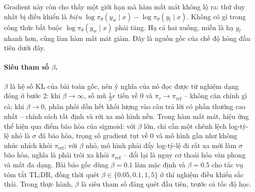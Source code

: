 Gradient này còn cho thấy một giới hạn mà hàm mất mát không lộ ra: thứ duy nhất bị điều khiển là \emph{hiệu} \( \log\pi_{\theta}(y_w \mid x) - \log\pi_{\theta}(y_l \mid x) \). Không có gì trong công thức bắt buộc \( \log\pi_{\theta}(y_w \mid x) \) phải tăng. Hạ cả hai xuống, miễn là hạ \( y_l \) nhanh hơn, cũng làm hàm mất mát giảm. Đây là nguồn gốc của chế độ hỏng đầu tiên dưới đây.

\paragraph{Siêu tham số \( \beta \).}
\( \beta \) là hệ số KL của bài toán gốc, nên ý nghĩa của nó đọc được từ nghiệm dạng đóng ở bước 2: khi \( \beta \to \infty \), số mũ \( \frac{1}{\beta} r \) tiến về 0 và \( \pi_r \to \pi_{\text{ref}} \) -- không căn chỉnh gì cả; khi \( \beta \to 0 \), phân phối dồn hết khối lượng vào câu trả lời có phần thưởng cao nhất -- chính sách tất định và rời xa mô hình nền. Trong hàm mất mát, hiệu ứng thể hiện qua điểm bão hòa của sigmoid: với \( \beta \) lớn, chỉ cần một chênh lệch log-tỷ-lệ nhỏ là \( \sigma \) đã bão hòa, trọng số gradient tụt về 0 và mô hình gần như không nhúc nhích khỏi \( \pi_{\text{ref}} \); với \( \beta \) nhỏ, mô hình phải đẩy log-tỷ-lệ đi rất xa mới làm \( \sigma \) bão hòa, nghĩa là phải trôi xa khỏi \( \pi_{\text{ref}} \) -- đổi lại là nguy cơ thoái hóa văn phong và mất đa dạng. Bài báo gốc dùng \( \beta = 0.1 \) làm mặc định và \( \beta = 0.5 \) cho tác vụ tóm tắt TL;DR, đồng thời quét \( \beta \in \{0.05, 0.1, 1, 5\} \) ở thí nghiệm điều khiển sắc thái. Trong thực hành, \( \beta \) là siêu tham số đáng quét đầu tiên, trước cả tốc độ học.

